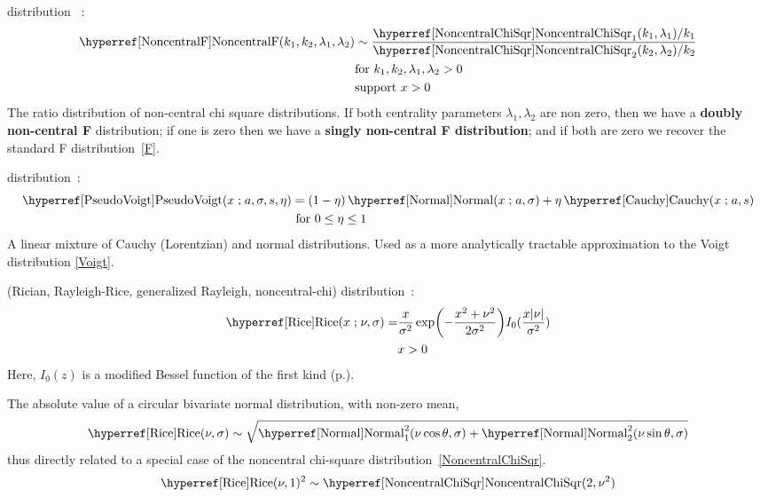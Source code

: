 \secbreak

 distribution~\cite{Fisher1928, Johnson1995} : \begin{align}
\label{NoncentralF}
\opr{NoncentralF}(k_1,k_2,\lambda_1,\lambda_2) &\sim \frac{\opr{NoncentralChiSqr}_1(k_1,\lambda_1)/k_1 }{\opr{NoncentralChiSqr}_2(k_2,\lambda_2)/k_2 }
\checked
\notag
\\
& \text{for } k_1,k_2,\lambda_1,\lambda_2 > 0  \notag \\
& \text{support } x>0
\end{align}
The ratio distribution of non-central chi square distributions. If both centrality parameters $\lambda_1,\lambda_2$ are non zero, then we have a {\bf doubly non-central F} distribution; if one is zero then we have a {\bf singly non-central F distribution}; and if both are zero we recover the standard F distribution~\eqref{F}.





\secbreak
{} distribution~\cite{Wertheim1974}: 
\begin{align}
\label{PseudoVoigt}
\opr{PseudoVoigt}(x\given a,\sigma, s, \eta) &= (1-\eta) \opr{Normal}(x\given a,\sigma) + \eta \opr{Cauchy}(x\given a,s)
\notag \checked
\\
& \text{ for } 0\leq\eta\leq1
\end{align}
A linear mixture of Cauchy (Lorentzian) and normal distributions. Used as a more analytically tractable approximation to the Voigt distribution \eqref{Voigt}. 


\secbreak
 (Rician, Rayleigh-Rice, generalized Rayleigh, noncentral-chi) distribution~\cite{Rice1945,Talukdar1991}:
\begin{align}
\label{Rice}
\opr{Rice}(x\given \nu,\sigma) = & \frac{x}{\sigma^2} \exp\Left(-\frac{x^2+\nu^2 }{2\sigma^2}  \Right) I_0(\frac{x |\nu|}{\sigma^2})
\checked
\\ 
& x>0 \notag
\end{align}
Here, $I_0(z)$ is a modified Bessel function of the first kind (p.\pageref{ModBesselFirst}). 

The absolute value of a circular bivariate normal distribution, with non-zero mean,
\[
\opr{Rice}(\nu,\sigma) \sim \sqrt{\opr{Normal}^2_1(\nu \cos \theta,\sigma)  +\opr{Normal}^2_2(\nu \sin \theta,\sigma)   }
\checked \notag
\]
thus directly related to a special case of the noncentral chi-square distribution~\eqref{NoncentralChiSqr}. 
\[
\opr{Rice}(\nu,1)^2 \sim  \opr{NoncentralChiSqr}(2,\nu^2) \checked
\notag
\]



